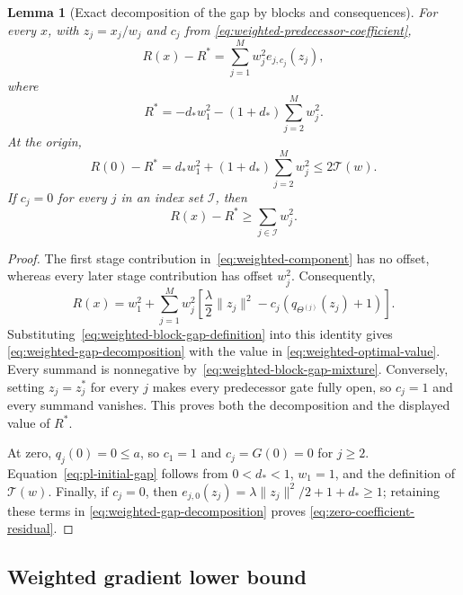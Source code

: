 \documentclass{article}
\newtheorem{lemma}[theorem]{Lemma}
\theoremstyle{definition}
\begin{document}
\begin{lemma}[Exact decomposition of the gap by blocks and consequences]
\label{lem:weighted-gap-decomposition}
For every $x$, with $z_j=x_j/w_j$ and $c_j$ from
\eqref{eq:weighted-predecessor-coefficient},
\begin{equation}
 R(x)-R^*
 =\sum_{j=1}^Mw_j^2e_{j,c_j}(z_j),
 \label{eq:weighted-gap-decomposition}
\end{equation}
where
\begin{equation}
 R^*=-d_*w_1^2-(1+d_*)\sum_{j=2}^Mw_j^2.
 \label{eq:weighted-optimal-value}
\end{equation}
At the origin,
\begin{equation}
 R(0)-R^*
 =d_*w_1^2+(1+d_*)\sum_{j=2}^Mw_j^2
 \le2\mathcal T(w).
 \label{eq:pl-initial-gap}
\end{equation}
If $c_j=0$ for every $j$ in an index set $\mathcal I$, then
\begin{equation}
 R(x)-R^*\ge\sum_{j\in\mathcal I}w_j^2.
 \label{eq:zero-coefficient-residual}
\end{equation}
\end{lemma}

\begin{proof}
The first stage contribution in~\eqref{eq:weighted-component} has no offset,
whereas every later stage contribution has offset $w_j^2$.  Consequently,
\begin{equation}
 R(x)=w_1^2+\sum_{j=1}^Mw_j^2
 \left[\frac\lambda2\|z_j\|^2-c_j(q_{\Theta^{(j)}}(z_j)+1)\right].
 \label{eq:weighted-objective-coefficient-form}
\end{equation}
Substituting~\eqref{eq:weighted-block-gap-definition} into this identity gives
\eqref{eq:weighted-gap-decomposition} with the value in
\eqref{eq:weighted-optimal-value}.  Every summand is
nonnegative by~\eqref{eq:weighted-block-gap-mixture}.  Conversely, setting
$z_j=z_j^*$ for every $j$ makes every predecessor gate fully open,
so $c_j=1$ and every summand vanishes.  This proves both the decomposition and
the displayed value of $R^*$.

At zero, $q_j(0)=0\le a$, so $c_1=1$ and $c_j=G(0)=0$ for $j\ge2$.
Equation~\eqref{eq:pl-initial-gap} follows from $0<d_*<1$, $w_1=1$, and the
definition of $\mathcal T(w)$.  Finally, if $c_j=0$, then
$e_{j,0}(z_j)=\lambda\|z_j\|^2/2+1+d_*\ge1$; retaining these terms in
\eqref{eq:weighted-gap-decomposition} proves
\eqref{eq:zero-coefficient-residual}.
\end{proof}

\subsection{Weighted gradient lower bound}
\end{document}
